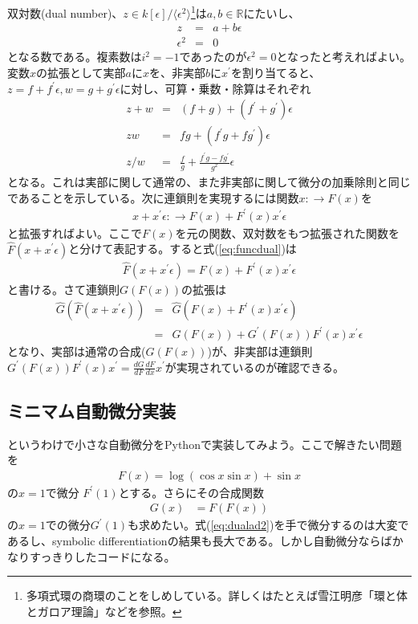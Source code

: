 双対数(dual number)、$z \in k[\epsilon]/\langle \epsilon^2\rangle$\footnote{多項式環の商環のことをしめしている。詳しくはたとえば雪江明彦「環と体とガロア理論」などを参照。}は$a, b \in \mathbb{R}$にたいし、
\begin{eqnarray}
z &=& a + b \epsilon \\
\epsilon^2 &=& 0
\end{eqnarray}
となる数である。複素数は$i^2 = -1$であったのが$\epsilon^2 = 0$となったと考えればよい。変数$x$の拡張として実部$a$に$x$を、非実部$b$に$x^\prime$を割り当てると、$z = f + f^\prime \epsilon, w = g + g^\prime \epsilon$に対し、可算・乗数・除算はそれぞれ
\begin{eqnarray}
\label{eq:add_ad_dual}
z + w &=& (f + g) + (f^\prime + g^\prime) \epsilon \\ 
\label{eq:mul_ad_dual}
z w &=& f g + (f^\prime g + f g^\prime) \epsilon\\ 
z/w &=& \frac{f}{g} + \frac{f^\prime g - f g^\prime}{g^2} \epsilon
\end{eqnarray}
となる。これは実部に関して通常の、また非実部に関して微分の加乗除則と同じであることを示している。次に連鎖則を実現するには関数$x:\to F(x)$を
\begin{eqnarray}
\label{eq:funcdual}
x+x^\prime \epsilon: \to F(x) + F^\prime(x) x^\prime \epsilon  
\end{eqnarray}
と拡張すればよい。ここで$F(x)$を元の関数、双対数をもつ拡張された関数を$\hat{F}(x+x^\prime \epsilon)$と分けて表記する。すると式(\ref{eq:funcdual})は
\begin{eqnarray}
\label{eq:chain_ad}
\hat{F}(x+x^\prime \epsilon) =  F(x) + F^\prime(x) x^\prime \epsilon
\end{eqnarray}
と書ける。さて連鎖則$G(F(x))$の拡張は
\begin{eqnarray}
\hat{G}(\hat{F}(x+x^\prime \epsilon)) &=&  \hat{G}(F(x) + F^\prime(x) x^\prime \epsilon) \\
&=& G(F(x)) + G^\prime(F(x)) F^\prime(x) x^\prime \epsilon
\end{eqnarray}
となり、実部は通常の合成($G(F(x))$)が、非実部は連鎖則$G^\prime(F(x)) F^\prime(x) x^\prime = \frac{d G}{d F} 
\frac{d F}{d x} x^\prime$が実現されているのが確認できる。

\subsection*{ミニマム自動微分実装}
というわけで小さな自動微分をPythonで実装してみよう。ここで解きたい問題を
\begin{eqnarray}
\label{eq:sample_func}
F(x) = \log{(\cos{x} \sin{x})} + \sin{x}
\end{eqnarray}
の$x=1$で微分 $F^\prime(1)$とする。さらにその合成関数
\begin{align}
\label{eq:dualad2}
G(x) &= F(F(x))
\end{align}
の$x=1$での微分$G^\prime(1)$も求めたい。式(\ref{eq:dualad2})を手で微分するのは大変であるし、symbolic differentiationの結果も長大である。しかし自動微分ならばかなりすっきりしたコードになる。

